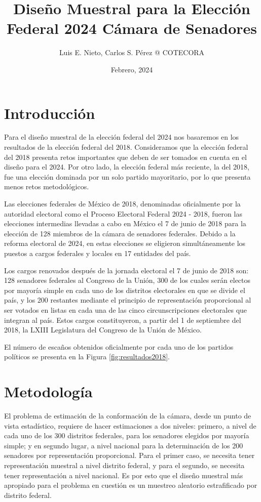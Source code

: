 \documentclass[]{article}
\title{Diseño Muestral para la Elección Federal 2024 Cámara de Senadores}
\author{Luis E. Nieto, Carlos S. Pérez  @ COTECORA}
\date{Febrero, 2024}
\begin{document}
\maketitle
\baselineskip=18pt

\hypertarget{intro}{%
\section{Introducción}
\label{intro}}

Para el diseño muestral de la elección federal del 2024 nos basaremos en los resultados de la elección federal del 2018. Consideramos que la elección federal del 2018 presenta retos importantes que deben de ser tomados en cuenta en el diseño para el 2024. Por otro lado, la elección federal más reciente, la del 2018, fue una elección dominada por un solo partido mayoritario, por lo que presenta menos retos metodológicos.

Las elecciones federales de México de 2018, denominadas oficialmente por la autoridad electoral como el Proceso Electoral Federal 2024 - 2018, fueron las elecciones intermedias llevadas a cabo en México el 7 de junio de 2018 para la elección de 128 miembros de la cámara de senadores federales. Debido a la reforma electoral de 2024, en estas elecciones se eligieron simultáneamente los puestos a cargos federales y locales en 17 entidades del país.

Los cargos renovados después de la jornada electoral el 7 de junio de 2018 son: 128 senadores federales al Congreso de la Unión, 300 de los cuales serán electos por mayoría simple en cada uno de los distritos electorales en que se divide el país, y los 200 restantes mediante el principio de representación proporcional al ser votados en listas en cada una de las cinco circunscripciones electorales que integran al país. Estos cargos constituyeron, a partir del 1 de septiembre del 2018, la LXIII Legislatura del Congreso de la Unión de México.

El número de escaños obtenidos oficialmente por cada uno de los partidos políticos se presenta en la Figura \ref{fig:resultados2018}. 

\hypertarget{metodologia}{%
\section{Metodología}
\label{metodologia}}

El problema de estimación de la conformación de la cámara, desde un punto de vista estadístico, requiere de hacer estimaciones a dos niveles: primero, a nivel de cada uno de los 300 distritos federales, para los senadores elegidos por mayoría simple; y en segundo lugar, a nivel nacional para la determinación de los 200 senadores por representación proporcional. Para el primer caso, se necesita tener representación muestral a nivel distrito federal, y para el segundo, se necesita tener representación a nivel nacional. Es por esto que el diseño muestral más apropiado para el problema en cuestión es un muestreo aleatorio estrafificado por distrito federal. 
\end{document}
